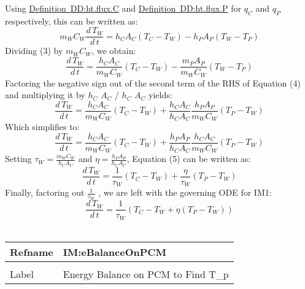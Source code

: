 \documentclass[12pt]{article}
\begin{document}
Using \hyperref[DD:ht.flux.C]{Definition~DD:ht.flux.C} and \hyperref[DD:ht.flux.P]{Definition~DD:ht.flux.P} for ${q_{C}}$ and ${q_{P}}$ respectively, this can be written as:
\begin{dmath}
{m_{W}} {C_{W}} \frac{d\,{T_{W}}}{d\,t}={h_{C}} {A_{C}} \left({T_{C}}-{T_{W}}\right)-{h_{P}} {A_{P}} \left({T_{W}}-{T_{P}}\right)
\end{dmath}
Dividing (3) by ${m_{W}}$${C_{W}}$, we obtain:
\begin{dmath}
\frac{d\,{T_{W}}}{d\,t}=\frac{{h_{C}} {A_{C}}}{{m_{W}} {C_{W}}} \left({T_{C}}-{T_{W}}\right)-\frac{{m_{P}} {A_{P}}}{{m_{W}} {C_{W}}} \left({T_{W}}-{T_{P}}\right)
\end{dmath}
Factoring the negative sign out of the second term of the RHS of Equation (4) and multiplying it by ${h_{C}}$ ${A_{C}}$ / ${h_{C}}$ ${A_{C}}$ yields:
\begin{dmath}
\frac{d\,{T_{W}}}{d\,t}=\frac{{h_{C}} {A_{C}}}{{m_{W}} {C_{W}}} \left({T_{C}}-{T_{W}}\right)+\frac{{h_{C}} {A_{C}}}{{h_{C}} {A_{C}}} \frac{{h_{P}} {A_{P}}}{{m_{W}} {C_{W}}} \left({T_{P}}-{T_{W}}\right)
\end{dmath}
Which simplifies to:
\begin{dmath}
\frac{d\,{T_{W}}}{d\,t}=\frac{{h_{C}} {A_{C}}}{{m_{W}} {C_{W}}} \left({T_{C}}-{T_{W}}\right)+\frac{{h_{P}} {A_{P}}}{{h_{C}} {A_{C}}} \frac{{h_{C}} {A_{C}}}{{m_{W}} {C_{W}}} \left({T_{P}}-{T_{W}}\right)
\end{dmath}
Setting ${τ_{W}}=\frac{{m_{W}} {C_{W}}}{{h_{C}} {A_{C}}}$ and $η=\frac{{h_{P}} {A_{P}}}{{h_{C}} {A_{C}}}$, Equation (5) can be written as:
\begin{dmath}
\frac{d\,{T_{W}}}{d\,t}=\frac{1}{{τ_{W}}} \left({T_{C}}-{T_{W}}\right)+\frac{η}{{τ_{W}}} \left({T_{P}}-{T_{W}}\right)
\end{dmath}
Finally, factoring out $\frac{1}{{τ_{W}}}$ , we are left with the governing ODE for IM1:
\begin{dmath}
\frac{d\,{T_{W}}}{d\,t}=\frac{1}{{τ_{W}}} \left({T_{C}}-{T_{W}}+η \left({T_{P}}-{T_{W}}\right)\right)
\end{dmath}
~\newline
\noindent \begin{minipage}{\textwidth}
\begin{tabular}{p{} p{}}
\toprule \textbf{Refname} & \textbf{IM:eBalanceOnPCM}
\label{IM:eBalanceOnPCM}
\\ \midrule \\
Label & Energy Balance on PCM to Find T\_p

\end{tabular}
\end{minipage}$$
\end{document}

